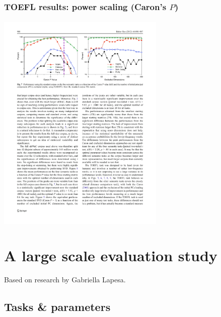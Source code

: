 \documentclass[t]{beamer} %
\begin{document}
\begin{frame}
  \frametitle{TOEFL results: power scaling (Caron's $P$)}
  \framesubtitle{\citep[p.~900, Fig.~7]{Bullinaria:Levy:12}}

  \ungap[1.5]
  \begin{center}
    \includegraphics[width=8cm]{img/BullinariaLevy2012_p900_fig7_power}
  \end{center}

  \ungap[.5]
\end{frame}



\section{A large scale evaluation study}

\begin{frame}[c]
  \centering

  
  \gap[2]
  Based on research by Gabriella Lapesa.
\end{frame}

\subsection{Tasks \& parameters}
\end{document}
